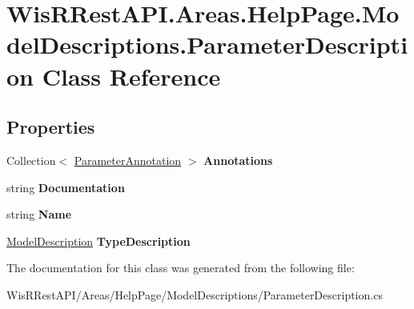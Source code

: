 \hypertarget{class_wis_r_rest_a_p_i_1_1_areas_1_1_help_page_1_1_model_descriptions_1_1_parameter_description}{}\section{Wis\+R\+Rest\+A\+P\+I.\+Areas.\+Help\+Page.\+Model\+Descriptions.\+Parameter\+Description Class Reference}
\label{class_wis_r_rest_a_p_i_1_1_areas_1_1_help_page_1_1_model_descriptions_1_1_parameter_description}
\subsection*{Properties}
\begin{DoxyCompactItemize}
\item 
\hypertarget{class_wis_r_rest_a_p_i_1_1_areas_1_1_help_page_1_1_model_descriptions_1_1_parameter_description_a2ca70aa299e10eedcf7e38d688452d7d}{}Collection$<$ \hyperlink{class_wis_r_rest_a_p_i_1_1_areas_1_1_help_page_1_1_model_descriptions_1_1_parameter_annotation}{Parameter\+Annotation} $>$ {\bfseries Annotations}\label{class_wis_r_rest_a_p_i_1_1_areas_1_1_help_page_1_1_model_descriptions_1_1_parameter_description_a2ca70aa299e10eedcf7e38d688452d7d}

\item 
\hypertarget{class_wis_r_rest_a_p_i_1_1_areas_1_1_help_page_1_1_model_descriptions_1_1_parameter_description_af5484e725407f796bcdf52658894bfb6}{}string {\bfseries Documentation}\label{class_wis_r_rest_a_p_i_1_1_areas_1_1_help_page_1_1_model_descriptions_1_1_parameter_description_af5484e725407f796bcdf52658894bfb6}

\item 
\hypertarget{class_wis_r_rest_a_p_i_1_1_areas_1_1_help_page_1_1_model_descriptions_1_1_parameter_description_a5da8e687c38e64f647b225e4af36ac5e}{}string {\bfseries Name}\label{class_wis_r_rest_a_p_i_1_1_areas_1_1_help_page_1_1_model_descriptions_1_1_parameter_description_a5da8e687c38e64f647b225e4af36ac5e}

\item 
\hypertarget{class_wis_r_rest_a_p_i_1_1_areas_1_1_help_page_1_1_model_descriptions_1_1_parameter_description_adac89efbb67ed38410e44f453ee2c433}{}\hyperlink{class_wis_r_rest_a_p_i_1_1_areas_1_1_help_page_1_1_model_descriptions_1_1_model_description}{Model\+Description} {\bfseries Type\+Description}\label{class_wis_r_rest_a_p_i_1_1_areas_1_1_help_page_1_1_model_descriptions_1_1_parameter_description_adac89efbb67ed38410e44f453ee2c433}

\end{DoxyCompactItemize}


The documentation for this class was generated from the following file\+:\begin{DoxyCompactItemize}
\item 
Wis\+R\+Rest\+A\+P\+I/\+Areas/\+Help\+Page/\+Model\+Descriptions/Parameter\+Description.\+cs\end{DoxyCompactItemize}
